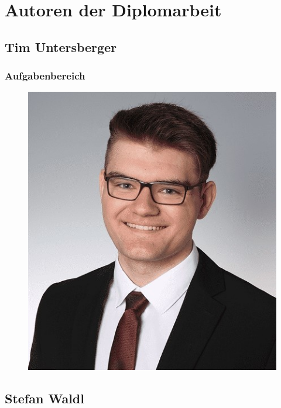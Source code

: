 \section*{Autoren der Diplomarbeit}
\subsection{Tim Untersberger}
\subsubsection{Aufgabenbereich}
\begin{figure}[H]
	\includegraphics[scale=0.3]{images/tim_untersberger.jpg}
\end{figure}
\pagebreak
\subsection{Stefan Waldl}
